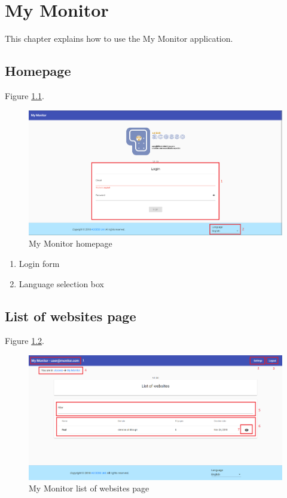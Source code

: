 \chapter{My Monitor}

This chapter explains how to use the My Monitor application.

\section{Homepage}

Figure \ref{fig:monitor_homepage}.

\begin{figure}[H]
    \centering
    \includegraphics[width=\linewidth]{lib/images/monitor/monitor_homepage.png}
    \caption{My Monitor homepage}
    \label{fig:monitor_homepage}
\end{figure}

\begin{enumerate}
    \item Login form
    \item Language selection box
\end{enumerate}

\section{List of websites page}

Figure \ref{fig:monitor_list_websites_page}.

\begin{figure}[H]
    \centering
    \includegraphics[width=\linewidth]{lib/images/monitor/monitor_list_websites_page.png}
    \caption{My Monitor list of websites page}
    \label{fig:monitor_list_websites_page}
\end{figure}

